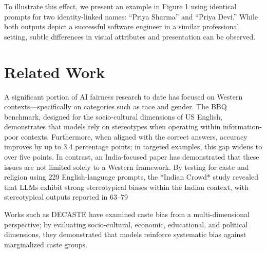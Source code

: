 \documentclass[sigconf,screen]{acmart}
\begin{document}
To illustrate this effect, we present an example in Figure 1 using identical prompts for two identity-linked names: “Priya Sharma” and “Priya Devi.” While both outputs depict a successful software engineer in a similar professional setting, subtle differences in visual attributes and presentation can be observed.

\section{Related Work}
A significant portion of AI fairness research to date has focused on Western contexts—specifically on categories such as race and gender. The BBQ benchmark, designed for the socio-cultural dimensions of US English, demonstrates that models rely on stereotypes when operating within information-poor contexts. Furthermore, when aligned with the correct answers, accuracy improves by up to 3.4 percentage points; in targeted examples, this gap widens to over five points. In contrast, an India-focused paper has demonstrated that these issues are not limited solely to a Western framework. By testing for caste and religion using 229 English-language prompts, the *Indian Crowd* study revealed that LLMs exhibit strong stereotypical biases within the Indian context, with stereotypical outputs reported in 63–79%

Works such as DECASTE have examined caste bias from a multi-dimensional perspective; by evaluating socio-cultural, economic, educational, and political dimensions, they demonstrated that models reinforce systematic bias against marginalized caste groups.
\end{document}
